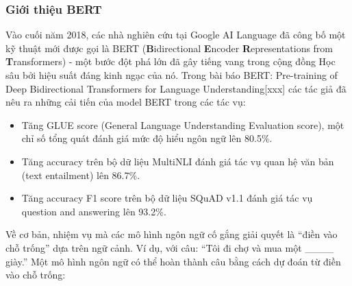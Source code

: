 

\subsubsection{Giới thiệu BERT}
Vào cuối năm 2018, các nhà nghiên cứu tại Google AI Language đã công bố một kỹ thuật mới được gọi là BERT ({\bf B}idirectional {\bf E}ncoder {\bf R}epresentations from {\bf T}ransformers) - một bước đột phá lớn đã gây tiếng vang trong cộng đồng Học sâu bởi hiệu suất đáng kinh ngạc của nó. Trong bài báo BERT: Pre-training of Deep Bidirectional Transformers for Language Understanding[xxx] các tác giả đã nêu ra những cải tiến của model BERT trong các tác vụ\cite{webpage20}:

\begin{itemize}
    \item Tăng GLUE score (General Language Understanding Evaluation score), một chỉ số tổng quát đánh giá mức độ hiểu ngôn ngữ lên 80.5\%.
    \item Tăng accuracy trên bộ dữ liệu MultiNLI đánh giá tác vụ quan hệ văn bản (text entailment) lên 86.7\%.
    \item Tăng accuracy F1 score trên bộ dữ liệu SQuAD v1.1 đánh giá tác vụ question and answering lên 93.2\%.
\end{itemize}
Về cơ bản, nhiệm vụ mà các mô hình ngôn ngữ cố gắng giải quyết là  ``điền vào chỗ trống'' dựa trên ngữ cảnh. Ví dụ, với câu: ``Tôi đi chợ và mua một \_\_\_\_ giày.''
Một mô hình ngôn ngữ có thể hoàn thành câu bằng cách dự đoán từ điền vào chỗ trống\cite{webpage19}:

